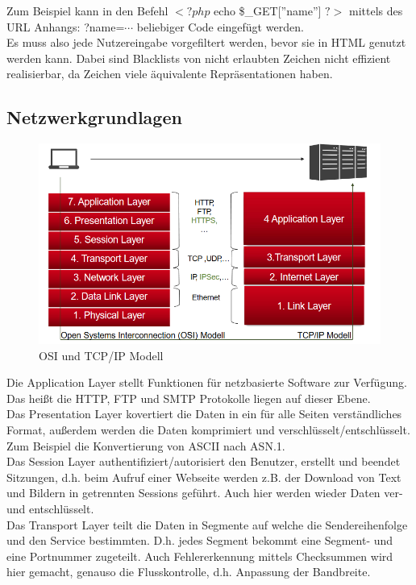 \documentclass[a4paper,12pt,leqno]{article}
\begin{document}
Zum Beispiel kann in den Befehl $<?php$ echo \$\_GET[''name''] $?>$ mittels des URL Anhangs: ?name=$\cdots$ beliebiger Code eingefügt werden.\\

Es muss also jede Nutzereingabe vorgefiltert werden, bevor sie in HTML genutzt werden kann. Dabei sind Blacklists von nicht erlaubten Zeichen nicht effizient realisierbar, da Zeichen viele äquivalente Repräsentationen haben.

\subsection{Netzwerkgrundlagen}

\begin{figure}[h!]
\centering
\includegraphics[scale=0.6]{Grafiken/OSI-TCPIP.png}
\caption{OSI und TCP/IP Modell}
\end{figure}
Die Application Layer stellt Funktionen für netzbasierte Software zur Verfügung. Das heißt die HTTP, FTP und SMTP Protokolle liegen auf dieser Ebene.\\

Das Presentation Layer kovertiert die Daten in ein für alle Seiten verständliches Format, außerdem werden die Daten komprimiert und verschlüsselt/entschlüsselt. Zum Beispiel die Konvertierung von ASCII nach ASN.1.\\

Das Session Layer authentifiziert/autorisiert den Benutzer, erstellt und beendet Sitzungen, d.h. beim Aufruf einer Webseite werden z.B. der Download von Text und Bildern in getrennten Sessions geführt. Auch hier werden wieder Daten ver- und entschlüsselt.\\

Das Transport Layer teilt die Daten in Segmente auf welche die Sendereihenfolge und den Service bestimmten.
D.h. jedes Segment bekommt eine Segment- und eine Portnummer zugeteilt.
Auch Fehlererkennung mittels Checksummen wird hier gemacht, genauso die Flusskontrolle, d.h. Anpassung der Bandbreite.\\ 
\end{document}
